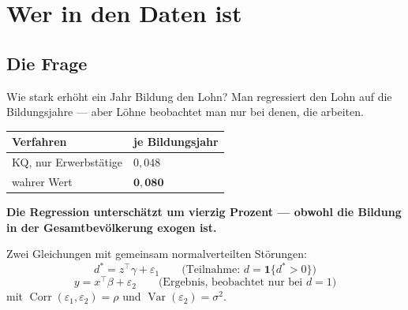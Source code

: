\chapter{Wer in den Daten ist}

\section{Die Frage}

\begin{merksatz}
Wie stark erhöht ein Jahr Bildung den Lohn? Man regressiert den Lohn auf die Bildungsjahre --- aber Löhne beobachtet man nur bei denen, die arbeiten.

\begin{center}
{\small
\renewcommand{\arraystretch}{1.48}
\begin{tabular}{@{}P{3.6cm}P{2.6cm}@{}}
\toprule
\textbf{Verfahren} & \textbf{je Bildungsjahr}\\
\midrule
KQ, nur Erwerbstätige & $0{,}048$\\
\midrule
wahrer Wert & $\mathbf{0{,}080}$\\
\bottomrule
\end{tabular}}
\end{center}

\begin{center}
\begin{minipage}{0.9\textwidth}
\textbf{Die Regression unterschätzt um vierzig Prozent --- obwohl die Bildung in der Gesamtbevölkerung exogen ist.}
\end{minipage}
\end{center}

\begin{center}
\begin{minipage}{0.88\textwidth}
\end{minipage}
\end{center}
\end{merksatz}

\begin{definition}
Zwei Gleichungen mit gemeinsam normalverteilten Störungen:
\[ d^{*} = z^{\top}\gamma + \varepsilon_1 \qquad \text{(Teilnahme: } d = \mathbf 1\{d^{*}>0\}\text{)} \]
\[ y = x^{\top}\beta + \varepsilon_2 \qquad \text{(Ergebnis, beobachtet nur bei } d = 1\text{)} \]
mit $\operatorname{Corr}(\varepsilon_1,\varepsilon_2) = \rho$ und $\operatorname{Var}(\varepsilon_2) = \sigma^{2}$.
\end{definition}

